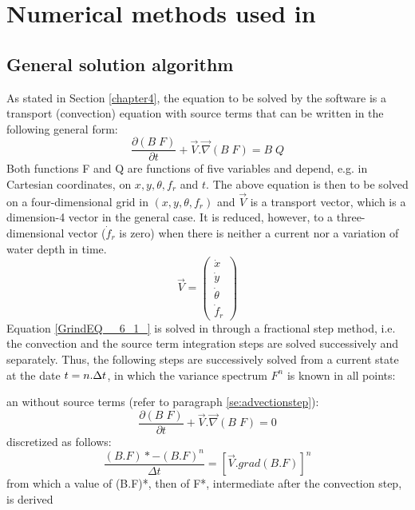 \chapter{  Numerical methods used in \tomawac}

\section{ General solution algorithm}

 As stated in Section \ref{chapter4}, the equation to be solved by the \tomawac software is a transport (convection) equation with source terms that can be written in the following general form:
\begin{equation} \label{GrindEQ__6_1_}
\frac{\partial \left(B\; F\right)}{\partial t} +\vec{V}.\vec{\nabla }\left(B\; F\right)=B\; Q
\end{equation}
Both functions F and Q are functions of five variables and depend, e.g. in Cartesian coordinates, on $x, y, \theta, f_r$ and $t$. The above equation is then to be solved on a four-dimensional grid in $(x, y, \theta, f_r)$ and $\vec{V}$ is a transport vector, which is a dimension-4 vector in the general case. It is reduced, however, to a three-dimensional vector ($\dot{f}_{r} $ is zero) when there is neither a current nor a variation of water depth in time.
\begin{equation} \label{GrindEQ__6_2_}
\vec{V}=\left(\begin{array}{c} {\dot{x}} \\ {\dot{y}} \\ {\dot{\theta }} \\ {\dot{f}_{r} } \end{array}\right)
\end{equation}
Equation \eqref{GrindEQ__6_1_} is solved in \tomawac through a fractional step method, i.e. the convection and the source term integration steps are solved successively and separately. Thus, the following steps are successively solved from a current state at the date $t = n.\Delta t$, in which the variance spectrum $F^n$ is known in all points:

  an \textbf{} without source terms (refer to paragraph \ref{se:advectionstep}):
\begin{equation} \label{GrindEQ__6_3_}
\frac{\partial \left(B\; F\right)}{\partial t} +\vec{V}.\vec{\nabla }\left(B\; F\right)=0
\end{equation}
discretized as follows:
\begin{equation} \label{GrindEQ__6_4_}
\frac{(B.F)*-(B.F)^{n} }{\Delta t} =\left[\vec{V}.grad(B.F)\right]^{n}
\end{equation}
from which a value of (B.F)*, then of F*, intermediate after the convection step, is derived

